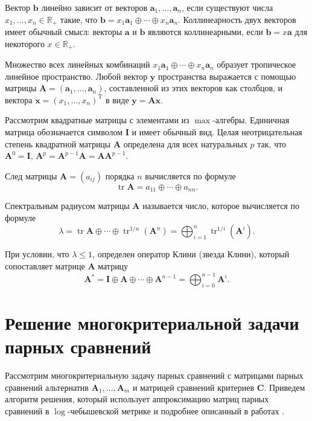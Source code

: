 \documentclass{spisok-article}
\begin{document}
Вектор $\bm{b}$ линейно зависит от векторов $\bm{a}_{1},\ldots,\bm{a}_{n}$, если существуют числа $x_{1},\ldots,x_{n}\in\mathbb{R}_{+}$ такие, что $\bm{b}=x_{1}\bm{a}_{1}\oplus\cdots\oplus x_{n}\bm{a}_{n}$. Коллинеарность двух векторов имеет обычный смысл: векторы $\bm{a}$ и $\bm{b}$ являются коллинеарными, если $\bm{b}=x\bm{a}$ для некоторого $x\in\mathbb{R}_{+}$.

Множество всех линейных комбинаций $x_{1}\bm{a}_{1}\oplus\cdots\oplus x_{n}\bm{a}_{n}$ образует тропическое линейное пространство. Любой вектор $\bm{y}$ пространства выражается с помощью матрицы $\bm{A}=(\bm{a}_{1},\ldots,\bm{a}_{n})$, составленной из этих векторов как столбцов, и вектора $\bm{x}=(x_{1},\ldots,x_{n})^{\mathrm{T}}$ в виде $\bm{y}=\bm{A}\bm{x}$.

        Рассмотрим квадратные матрицы с элементами из $\max$-алгебры. Единичная матрица обозначается символом $\bm{I}$ и имеет обычный вид. Целая неотрицательная степень квадратной матрицы $\bm{A}$ определена для всех натуральных $p$ так, что $\bm{A}^{0}=\bm{I}$, $\bm{A}^{p}=\bm{A}^{p-1}\bm{A}=\bm{A}\bm{A}^{p-1}$.

        След матрицы $\bm{A}=(a_{ij})$ порядка $n$ вычисляется по формуле 
        $$\mathop\mathrm{tr}\bm{A}=a_{11}\oplus\cdots\oplus a_{nn}.$$

        Спектральным радиусом матрицы $\bm{A}$ называется число, которое вычисляется по формуле
        \begin{equation*}
        \lambda
        =
        \mathop\mathrm{tr}\bm{A}\oplus\cdots\oplus\mathop\mathrm{tr}\nolimits^{1/n}(\bm{A}^{n})
        =
        \bigoplus_{i=1}^{n}{\mathop\mathrm{tr}}^{1/i}(\bm{A}^{i}).
        \end{equation*}

        При условии, что $\lambda\leq1$, определен оператор Клини (звезда Клини), который сопоставляет матрице $\bm{A}$ матрицу
        \begin{equation*}
        \bm{A}^{\ast}
        =
        \bm{I}\oplus\bm{A}\oplus\cdots\oplus\bm{A}^{n-1}
        =
        \bigoplus_{i=0}^{n-1}\bm{A}^{i}.
        \end{equation*}

    \section{Решение многокритериальной задачи парных сравнений}

    Рассмотрим многокритериальную задачу парных сравнений с матрицами парных сравнений альтернатив $\bm{A}_{1},\ldots,\bm{A}_{m}$ и матрицей сравнений критериев $\bm{C}$. Приведем алгоритм решения, который использует аппроксимацию матриц парных сравнений в $\log$-чебышевской метрике и подробнее описанный в работах \cite{Krivulin2019Metody,Krivulin2019Tropical,Krivulin2022Using}. 
\end{document}
